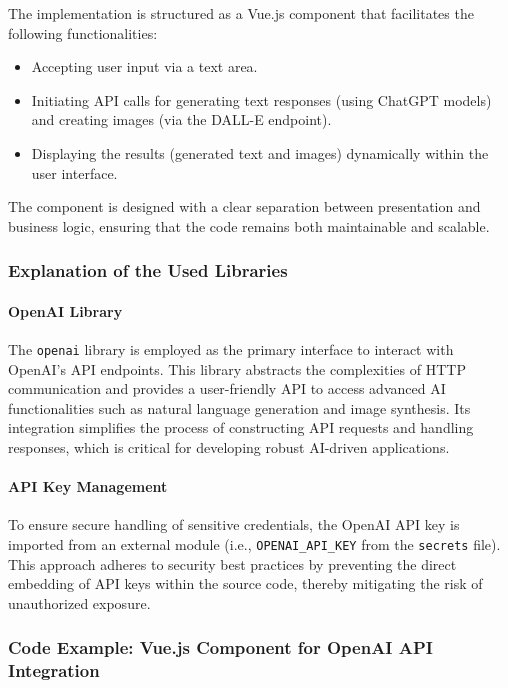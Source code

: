 The implementation is structured as a Vue.js component that facilitates the following functionalities:
\begin{itemize}
    \item Accepting user input via a text area.
    \item Initiating API calls for generating text responses (using ChatGPT models) and creating images (via the DALL-E endpoint).
    \item Displaying the results (generated text and images) dynamically within the user interface.
\end{itemize}

The component is designed with a clear separation between presentation and business logic, ensuring that the code remains both maintainable and scalable.

\subsubsection{Explanation of the Used Libraries}

\paragraph{OpenAI Library}  
The \texttt{openai} library is employed as the primary interface to interact with OpenAI’s API endpoints. This library abstracts the complexities of HTTP communication and provides a user-friendly API to access advanced AI functionalities such as natural language generation and image synthesis. Its integration simplifies the process of constructing API requests and handling responses, which is critical for developing robust AI-driven applications.

\paragraph{API Key Management}  
To ensure secure handling of sensitive credentials, the OpenAI API key is imported from an external module (i.e., \texttt{OPENAI\_API\_KEY} from the \texttt{secrets} file). This approach adheres to security best practices by preventing the direct embedding of API keys within the source code, thereby mitigating the risk of unauthorized exposure.

\subsubsection{Code Example: Vue.js Component for OpenAI API Integration}

